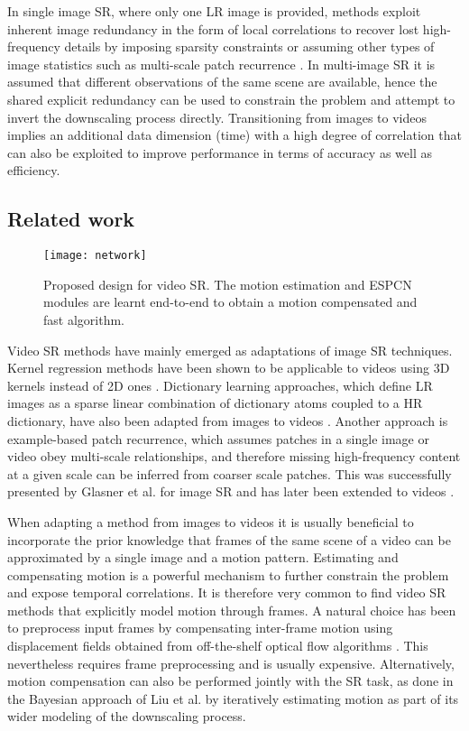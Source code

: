 \documentclass[10pt,twocolumn,letterpaper]{article}
\begin{document}
In single image \gls{SR}, where only one \gls{LR} image is provided, methods exploit inherent image redundancy in the form of local correlations to recover lost high-frequency details by imposing sparsity constraints \cite{Yang2010} or assuming other types of image statistics such as multi-scale patch recurrence \cite{Glasner2009}. In multi-image \gls{SR} \cite{Park2003} it is assumed that different observations of the same scene are available, hence the shared explicit redundancy can be used to constrain the problem and attempt to invert the downscaling process directly. Transitioning from images to videos implies an additional data dimension (time) with a high degree of correlation that can also be exploited to improve performance in terms of accuracy as well as efficiency.





\subsection{Related work}

\begin{figure}[t]
\centering
	\texttt{[image: network]}
	\caption{Proposed design for video \gls{SR}. The motion estimation and ESPCN modules are learnt end-to-end to obtain a motion compensated and fast algorithm.}
	\label{fig:network}
\end{figure}

Video \gls{SR} methods have mainly emerged as adaptations of image \gls{SR} techniques. Kernel regression methods \cite{Takeda2007} have been shown to be applicable to videos using 3D kernels instead of 2D ones \cite{Takeda2009}. Dictionary learning approaches, which define \gls{LR} images as a sparse linear combination of dictionary atoms coupled to a \gls{HR} dictionary, have also been adapted from images \cite{Yang2012} to videos \cite{Dai2015}. Another approach is example-based patch recurrence, which assumes patches in a single image or video obey multi-scale relationships, and therefore missing high-frequency content at a given scale can be inferred from coarser scale patches. This was successfully presented by Glasner et al. \cite{Glasner2009} for image \gls{SR} and has later been extended to videos \cite{Shahar2011}.

When adapting a method from images to videos it is usually beneficial to incorporate the prior knowledge that frames of the same scene of a video can be approximated by a single image and a motion pattern. Estimating and compensating motion is a powerful mechanism to further constrain the problem and expose temporal correlations. It is therefore very common to find video \gls{SR} methods that explicitly model motion through frames. A natural choice has been to preprocess input frames by compensating inter-frame motion using displacement fields obtained from off-the-shelf optical flow algorithms \cite{Takeda2009}. This nevertheless requires frame preprocessing and is usually expensive. Alternatively, motion compensation can also be performed jointly with the \gls{SR} task, as done in the Bayesian approach of Liu et al. \cite{Liu2015} by iteratively estimating motion as part of its wider modeling of the downscaling process.
\end{document}
